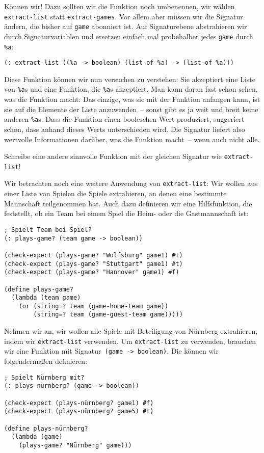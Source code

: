 Können wir! Dazu sollten wir die Funktion noch umbenennen, wir wählen
\lstinline{extract-list} statt \lstinline{extract-games}.  Vor allem
aber müssen wir die Signatur ändern, die bisher auf \lstinline{game}
abonniert ist.  Auf Signaturebene abstrahieren wir durch
Signaturvariablen und ersetzen einfach mal probehalber jedes
\lstinline{game} durch \lstinline{%a}:
%
\begin{lstlisting}
(: extract-list ((%a -> boolean) (list-of %a) -> (list-of %a)))
\end{lstlisting}
%
Diese Funktion können wir nun versuchen zu verstehen: Sie akzeptiert
eine Liste von \lstinline{%a}s und eine Funktion, die \lstinline{%a}s
akzeptiert.  Man kann daran fast schon sehen, was die Funktion macht:
Das einzige, was sie mit der Funktion anfangen kann, ist sie auf die
Elemente der Liste anzuwenden~-- sonst gibt es ja weit und breit keine
anderen \lstinline{%a}s.  Dass die Funktion einen booleschen Wert
produziert, suggeriert schon, dass anhand dieses Werts unterschieden
wird.  Die Signatur liefert also wertvolle Informationen darüber, was
die Funktion macht~-- wenn auch nicht alle.
%
\begin{aufgabeinline}
  Schreibe eine andere sinnvolle Funktion mit der gleichen Signatur
  wie \lstinline{extract-list}!
\end{aufgabeinline}
%
Wir betrachten noch eine weitere Anwendung von
\lstinline{extract-list}: Wir wollen aus einer Liste von Spielen die
Spiele extrahieren, an denen eine bestimmte Mannschaft teilgenommen
hat.  Auch dazu definieren wir eine Hilfsfunktion, die feststellt, ob
ein Team bei einem Spiel die Heim- oder die Gastmannschaft ist:
%
\begin{lstlisting}
; Spielt Team bei Spiel?
(: plays-game? (team game -> boolean))

(check-expect (plays-game? "Wolfsburg" game1) #t)
(check-expect (plays-game? "Stuttgart" game1) #t)
(check-expect (plays-game? "Hannover" game1) #f)

(define plays-game?
  (lambda (team game)
    (or (string=? team (game-home-team game))
        (string=? team (game-guest-team game)))))
\end{lstlisting}
%
Nehmen wir an, wir wollen alle Spiele mit Beteiligung von Nürnberg
extrahieren, indem wir \lstinline{extract-list} verwenden.  Um
\lstinline{extract-list} zu verwenden, brauchen wir eine Funktion mit
Signatur~\lstinline{(game -> boolean)}.  Die können wir folgendermaßen
definieren:
%
\begin{lstlisting}
; Spielt Nürnberg mit?
(: plays-nürnberg? (game -> boolean))

(check-expect (plays-nürnberg? game1) #f)
(check-expect (plays-nürnberg? game5) #t)

(define plays-nürnberg?
  (lambda (game)
    (plays-game? "Nürnberg" game)))
\end{lstlisting}
